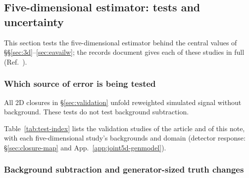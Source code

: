 \subsection{Five-dimensional estimator: tests and uncertainty}
\label{sec:5d}

This section tests the five-dimensional estimator behind the central values of \S\S\ref{sec:3d}--\ref{sec:eavailw}; the records document gives each of these studies in full (Ref.~\cite{NoteRecords2026}).

\subsubsection{Which source of error is being tested}
\label{sec:val-fiveaxis}

All 2D closures in \S\ref{sec:validation} unfold reweighted simulated signal without background. These tests do not test background subtraction.

\providecommand{\pcell}[2]{\parbox[t]{#1}{\raggedright\strut#2\strut}}
Table~\ref{tab:test-index} lists the validation studies of the article and of this note, with each five-dimensional study's backgrounds and domain (detector response: \S\ref{sec:closure-map} and App.~\ref{app:joint5d-genmodel}).

\subsubsection{Background subtraction and generator-sized truth changes}
\label{sec:val-negweight}

